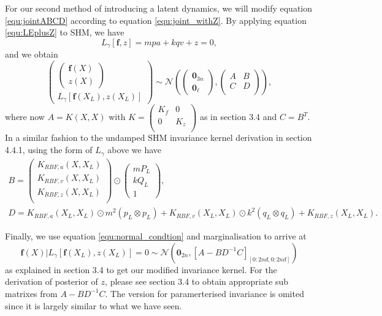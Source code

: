 \documentclass{statsmsc}
\begin{document}
For our second method of introducing a latent dynamics, we will modify equation \ref{equ:jointABCD} according to equation \ref{equ:joint_withZ}.
By applying equation \ref{equ:LEplusZ} to SHM, we have $$L_\gamma[\mathbf{f},z]=mpa+kqv+z=0,$$ and we obtain 
$$
\begin{pmatrix}
  \begin{pmatrix}
    \mathbf{f}(X)\\z(X)
  \end{pmatrix}\\L_\gamma[\mathbf{f}(X_L), z(X_L)]
\end{pmatrix}
\sim\mathcal{N}
\left(\begin{pmatrix}
  \mathbf{0}_{3n}\\\mathbf{0}_\ell
\end{pmatrix},\begin{pmatrix}
  A & B\\ C&D\\
\end{pmatrix}\right),
$$
where now $A=K(X,X)$ with $K=\begin{pmatrix}
  K_f & 0 \\ 0 & K_z\\
\end{pmatrix}$ as in section 3.4 and $C=B^T$.
In a similar fashion to the undamped SHM invariance kernel derivation in section 4.4.1, using the form of $L_\gamma$ above we have 
$$
\begin{gathered}
B=\begin{pmatrix}
  K_{RBF,a}(X, X_L) \\ K_{RBF, v}(X, X_L) \\ K_{RBF, z}(X, X_L)\\
\end{pmatrix}
\odot \begin{pmatrix}
  mP_L \\ kQ_L \\ 1
\end{pmatrix},\\ 
D = K_{RBF, a}(X_L, X_L)\odot m^2(p_L\otimes p_L) + K_{RBF, v}(X_L, X_L)\odot k^2(q_L\otimes q_L) + K_{RBF, z}(X_L, X_L).
\end{gathered}
$$

Finally, we use equation \ref{equ:normal_condtion} and marginalisation to arrive at
$$
\mathbf{f}(X)|L_\gamma[\mathbf{f}(X_L),z(X_L)]=0 \sim \mathcal{N}(\mathbf{0}_{2n}, [A-BD^{-1}C]_{[0:2nd, 0:2nd]})
$$
as explained in section 3.4 to get our modified invariance kernel.
For the derivation of posterior of $z$, please see section 3.4 to obtain appropriate sub matrixes from $A-BD^{-1}C$.
The version for paramerterised invariance is omited since it is largely similar to what we have seen.
\end{document}
